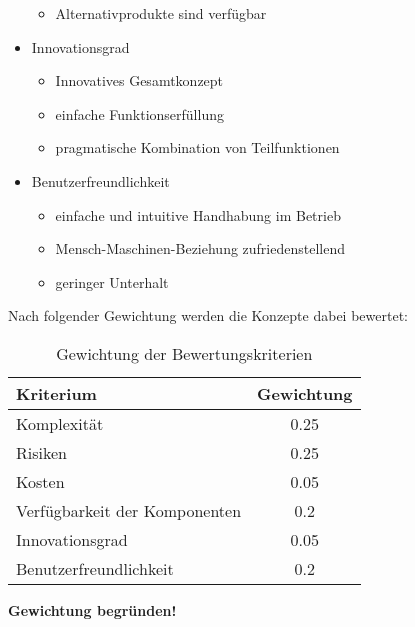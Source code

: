 \begin{itemize}
\begin{itemize}
	\item Alternativprodukte sind verfügbar
	\end{itemize}

	\item Innovationsgrad
	\begin{itemize}
	\item Innovatives Gesamtkonzept
	
	\item einfache Funktionserfüllung
	
	\item pragmatische Kombination von Teilfunktionen
	\end{itemize}

	\item Benutzerfreundlichkeit
	\begin{itemize}
	\item einfache und intuitive Handhabung im Betrieb	
		
	\item Mensch-Maschinen-Beziehung zufriedenstellend
	
	\item geringer Unterhalt
	
	\end{itemize}

\end{itemize}

Nach folgender Gewichtung werden die Konzepte dabei bewertet:
\begin{table}[H]
	\begin{tabular}{|l|c|}
	\hline 
	\textbf{Kriterium} & \textbf{Gewichtung} \\ 
	\hline 
	Komplexität & 0.25 \\ 
	\hline 
	Risiken & 0.25 \\ 
	\hline 
	Kosten & 0.05 \\ 
	\hline 
	Verfügbarkeit der Komponenten & 0.2 \\ 
	\hline 
	Innovationsgrad & 0.05 \\ 
	\hline 
	Benutzerfreundlichkeit & 0.2 \\ 
	\hline 
	\end{tabular} 
	\caption{Gewichtung der Bewertungskriterien}
	\label{tab:gewichtung}
\end{table}

\textbf{Gewichtung begründen!}

